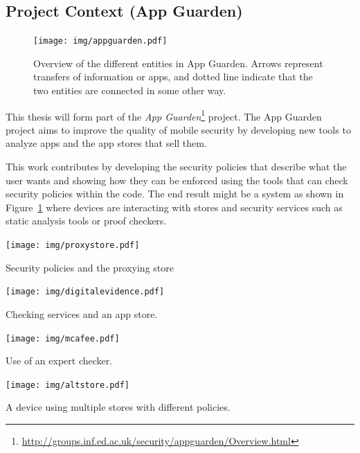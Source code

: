 \documentclass[a4paper]{article}
\begin{document}
\subsection{Project Context (App Guarden)}

\begin{figure}
  \texttt{[image: img/appguarden.pdf]}
  \caption{Overview of the different entities in App Guarden.  Arrows represent
  transfers of information or apps, and dotted line indicate that the two
  entities are connected in some other way.}
\label{fig:ag}
\end{figure}

This thesis will form part of the \emph{App
Guarden}\footnote{\url{http://groups.inf.ed.ac.uk/security/appguarden/Overview.html}}
project.  The App Guarden project aims to improve the quality of mobile security
by developing new tools to analyze apps and the app stores that sell them.

This work contributes by developing the security policies that describe what the
user wants and showing how they can be enforced using the tools that can check
security policies within the code.  The end result might be a system as shown in
Figure~\ref{fig:ag} where devices are interacting with stores and security
services such as static analysis tools or proof checkers. 

\begin{marginfigure}
  \texttt{[image: img/proxystore.pdf]}
  \caption{Security policies and the proxying store}
  \label{fig:proxy}
\end{marginfigure}

\begin{marginfigure}
  \texttt{[image: img/digitalevidence.pdf]}
  \caption{Checking services and an app store.}
  \label{fig:de}
\end{marginfigure}

\begin{marginfigure}
  
  \texttt{[image: img/mcafee.pdf]}
  \caption{Use of an expert checker.}
\label{fig:mcafee}
\end{marginfigure}

\begin{marginfigure}
  
  \texttt{[image: img/altstore.pdf]}
  \caption{A device using multiple stores with different policies.}
\label{fig:altstore}
\end{marginfigure}
\end{document}
